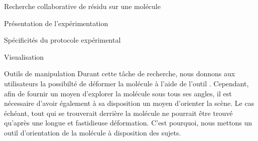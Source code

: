 \documentclass[myfrancais]{mythesis}
\begin{document}
\begin{mychapter}{Recherche collaborative de résidu sur une molécule}
\begin{mysection}{Présentation de l'expérimentation}
\begin{mysubsection}{Spécificités du protocole expérimental}
\begin{mysubsubsection}{Visualisation}
					\begin{myfigure}
					\end{myfigure}
				\end{mysubsubsection}
				\begin{mysubsubsection}{Outils de manipulation}
					Durant cette tâche de recherche, nous donnons aux utilisateurs la possibilté de déformer la molécule à l'aide de l'outil .
					Cependant, afin de fournir un moyen d'explorer la molécule sous tous ses angles, il est nécessaire d'avoir également à sa disposition un moyen d'orienter la scène.
					Le cas échéant, tout  qui se trouverait derrière la molécule ne pourrait être trouvé qu'après une longue et fastidieuse déformation.
					C'est pourquoi, nous mettons un outil d'orientation de la molécule à disposition des sujets.


\end{mysubsubsection}
\end{mysubsection}
\end{mysection}
\end{mychapter}
\end{document}
